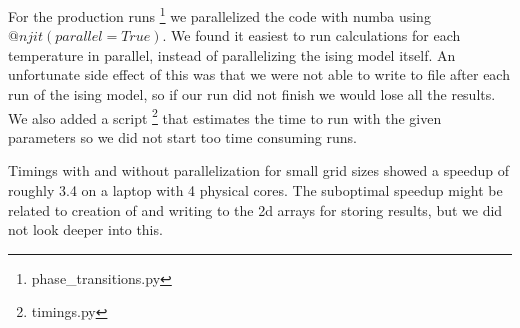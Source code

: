 For the production runs \footnote{phase\_transitions.py} we parallelized the code with
numba using $@njit(parallel=True)$. We found it easiest to run calculations for
each temperature in parallel, instead of parallelizing the ising model itself.
An unfortunate side effect of this was that we were not able to write to file
after each run of the ising model, so if our run did not finish we would lose
all the results. We also added a script \footnote{timings.py} that estimates the time to
run with the given parameters so we did not start too time
consuming runs.

Timings with and without parallelization for small grid sizes showed a speedup
of roughly 3.4 on a laptop with 4 physical cores. The suboptimal speedup might
be related to creation of and writing to the 2d arrays for storing results,
but we did not look deeper into this.
